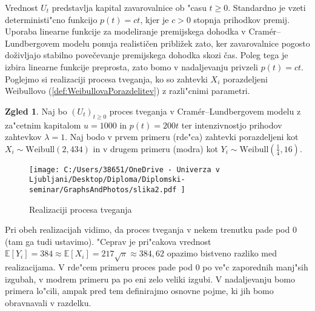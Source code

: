 \documentclass[12pt, a4paper, reqno]{amsart}
\theoremstyle{definition}
\newtheorem{zgled}[definicija]{Zgled}
\theoremstyle{plain}
\newcommand{\E}{\mathbb{E}}
\newcommand{\1}{\mathds{1}}
\begin{document}
        Vrednost $U_t$ predstavlja kapital zavarovalnice ob "casu $t\geq0$. Standardno je  
        vzeti deterministi"cno funkcijo $p(t) = ct$, kjer je $c>0$ stopnja prihodkov premij.
        Uporaba linearne funkcije za modeliranje premijskega dohodka v Cramér--Lundbergovem 
        modelu ponuja realističen približek zato, ker zavarovalnice pogosto doživljajo 
        stabilno povečevanje premijskega dohodka skozi čas. Poleg tega je izbira linearne 
        funkcije preprosta, zato bomo v nadaljevanju privzeli $p(t) = ct$. Poglejmo si 
        realizaciji procesa tveganja, ko so zahtevki $X_i$ porazdeljeni Weibullovo 
        (\ref{def:WeibullovaPorazdelitev}) z razli"cnimi parametri. 

        \begin{zgled}
            Naj bo $(U_t)_{t\geq0}$ proces tveganja v Cramér--Lundbergovem modelu z za"cetnim kapitalom
            $u = 1000$ in $p(t) = 200t$ ter intenzivnostjo prihodov zahtevkov $\lambda=1$. %
            Naj bodo v prvem primeru (rde"ca) 
            zahtevki porazdeljeni kot $X_i \sim \text{Weibull}(2, 434)$ in v drugem primeru (modra) kot
            $Y_i \sim \text{Weibull}(\tfrac{1}{4}, 16)$.
            
            \begin{figure}[H]
                \centering
                \texttt{[image: 
                    C:/Users/38651/OneDrive - Univerza v Ljubljani/Desktop/Diploma/Diplomski-seminar/GraphsAndPhotos/slika2.pdf
                    ]}
                \caption{Realizaciji procesa tveganja}
                \label{fig:slika3}
            \end{figure}

            \noindent
            Pri obeh realizacijah vidimo, da proces tveganja v nekem trenutku pade pod $0$ (tam ga 
            tudi ustavimo). "Ceprav je pri"cakova vrednost 
            $\E\left[Y_i\right] = 384 \approx \E\left[X_i\right] = 217\sqrt{\pi} \approx 384{,}62$ 
            opazimo bistveno razliko med realizacijama. V rde"cem primeru proces pade pod
            $0$ po ve"c zaporednih manj"sih izgubah, v modrem primeru pa po eni zelo veliki izgubi. 
            V nadaljevanju bomo primera lo"cili, ampak pred tem 
            definirajmo osnovne pojme, ki jih bomo obravnavali v razdelku.

            \label{zgd:weibullProcesTveganja}
        \end{zgled}
\end{document}
